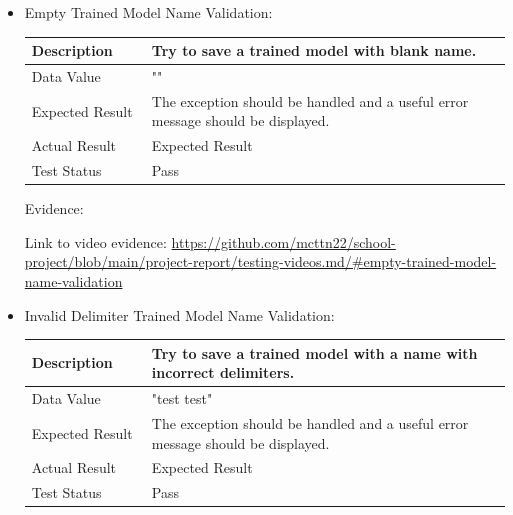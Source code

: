 \documentclass[./project-report/src/latex/project-report.tex]{subfiles}
\begin{document}
\begin{itemize}
	\pagebreak
	
	\item Empty Trained Model Name Validation: \newline\newline
		\begin{tabular}{|p{0.25\linewidth}|p{0.75\linewidth}|}
			\hline
			Description & Try to save a trained model with blank name. \\
			\hline
			Data Value & "" \\
			\hline
			Expected Result & The exception should be handled and a useful error message should be displayed. \\
			\hline
			Actual Result & Expected Result \\
			\hline
			Test Status & Pass \\
			\hline
		\end{tabular}

		\vspace{5mm}

		Evidence:
		\begin{figure}[h!]
		\centering
		\end{figure}

		Link to video evidence: \url{https://github.com/mcttn22/school-project/blob/main/project-report/testing-videos.md/#empty-trained-model-name-validation}

	\pagebreak

	\item Invalid Delimiter Trained Model Name Validation: \newline\newline
		\begin{tabular}{|p{0.25\linewidth}|p{0.75\linewidth}|}
			\hline
			Description & Try to save a trained model with a name with incorrect delimiters. \\
			\hline
			Data Value & "test  test" \\
			\hline
			Expected Result & The exception should be handled and a useful error message should be displayed. \\
			\hline
			Actual Result & Expected Result \\
			\hline
			Test Status & Pass \\
			\hline
		\end{tabular}


\end{itemize}
\end{document}
